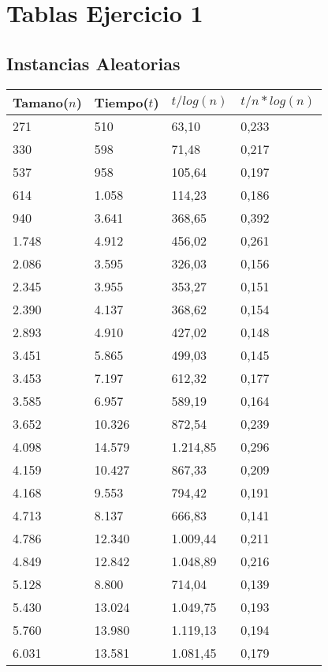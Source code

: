 \section{Tablas Ejercicio 1} \label{sec:tablas-ej1}
\subsection{Instancias Aleatorias}
\begin{table}[H]
\parbox{0.3\textwidth}{
  \begin{tabular}{| l | l | l |l |}
    \hline
    Tamano($n$) & Tiempo($t$) & $t / log(n)$ & $t / n*log(n)$ \\ \hline
   271	&	510	&	63,10	&	0,233	\\ \hline
330	&	598	&	71,48	&	0,217	\\ \hline
537	&	958	&	105,64	&	0,197	\\ \hline
614	&	1.058	&	114,23	&	0,186	\\ \hline
940	&	3.641	&	368,65	&	0,392	\\ \hline
1.748	&	4.912	&	456,02	&	0,261	\\ \hline
2.086	&	3.595	&	326,03	&	0,156	\\ \hline
2.345	&	3.955	&	353,27	&	0,151	\\ \hline
2.390	&	4.137	&	368,62	&	0,154	\\ \hline
2.893	&	4.910	&	427,02	&	0,148	\\ \hline
3.451	&	5.865	&	499,03	&	0,145	\\ \hline
3.453	&	7.197	&	612,32	&	0,177	\\ \hline
3.585	&	6.957	&	589,19	&	0,164	\\ \hline
3.652	&	10.326	&	872,54	&	0,239	\\ \hline
4.098	&	14.579	&	1.214,85	&	0,296	\\ \hline
4.159	&	10.427	&	867,33	&	0,209	\\ \hline
4.168	&	9.553	&	794,42	&	0,191	\\ \hline
4.713	&	8.137	&	666,83	&	0,141	\\ \hline
4.786	&	12.340	&	1.009,44	&	0,211	\\ \hline
4.849	&	12.842	&	1.048,89	&	0,216	\\ \hline
5.128	&	8.800	&	714,04	&	0,139	\\ \hline
5.430	&	13.024	&	1.049,75	&	0,193	\\ \hline
5.760	&	13.980	&	1.119,13	&	0,194	\\ \hline
6.031	&	13.581	&	1.081,45	&	0,179	\\ \hline

\end{tabular}}
\end{table}
